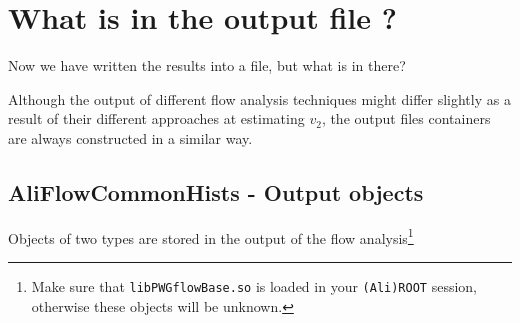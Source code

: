 \documentclass[a4paper]{book}
\numberwithin{equation}{subsection}
\begin{document}
\section{What is in the output file ?}
 Now we have written the results into a file, but what is in there? 

Although the output of different flow analysis techniques might differ slightly as a result of their different approaches at estimating $v_2$, the output files containers are always constructed in a similar way. 

\subsection{AliFlowCommonHists - Output objects}\label{sec:commonhists}
Objects of two types are stored in the output of the flow analysis\footnote{Make sure that \texttt{libPWGflowBase.so} is loaded in your \texttt{(Ali)ROOT} session, otherwise these objects will be unknown.}
\end{document}
